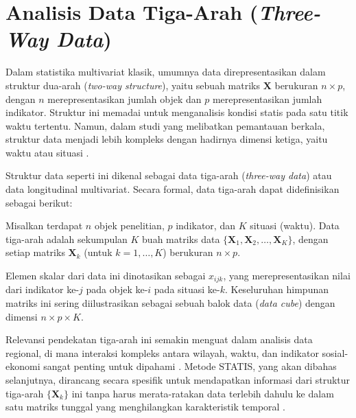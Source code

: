 \section{\normalsize Analisis Data Tiga-Arah (\textit{Three-Way Data})}

Dalam statistika multivariat klasik, umumnya data direpresentasikan dalam struktur dua-arah (\textit{two-way structure}), yaitu sebuah matriks $\mathbf{X}$ berukuran $n \times p$, dengan $n$ merepresentasikan jumlah objek dan $p$ merepresentasikan jumlah indikator. Struktur ini memadai untuk menganalisis kondisi statis pada satu titik waktu tertentu. Namun, dalam studi yang melibatkan pemantauan berkala, struktur data menjadi lebih kompleks dengan hadirnya dimensi ketiga, yaitu waktu atau situasi \citep{kroonenberg2008}.

Struktur data seperti ini dikenal sebagai data tiga-arah (\textit{three-way data}) atau data longitudinal multivariat. Secara formal, data tiga-arah dapat didefinisikan sebagai berikut:

\begin{definition}
  Misalkan terdapat $n$ objek penelitian, $p$ indikator, dan $K$ situasi (waktu). Data tiga-arah adalah sekumpulan $K$ buah matriks data $\{\mathbf{X}_1, \mathbf{X}_2, \dots, \mathbf{X}_K\}$, dengan setiap matriks $\mathbf{X}_k$ (untuk $k = 1, \dots, K$) berukuran $n \times p$.

  Elemen skalar dari data ini dinotasikan sebagai $x_{ijk}$, yang merepresentasikan nilai dari indikator ke-$j$ pada objek ke-$i$ pada situasi ke-$k$. Keseluruhan himpunan matriks ini sering diilustrasikan sebagai sebuah balok data (\textit{data cube}) dengan dimensi $n \times p \times K$.
\end{definition}

Relevansi pendekatan tiga-arah ini semakin menguat dalam analisis data regional, di mana interaksi kompleks antara wilayah, waktu, dan indikator sosial-ekonomi sangat penting untuk dipahami \citep{biegert2023household}. Metode STATIS, yang akan dibahas selanjutnya, dirancang secara spesifik untuk mendapatkan informasi dari struktur tiga-arah $\{\mathbf{X}_k\}$ ini tanpa harus merata-ratakan data terlebih dahulu ke dalam satu matriks tunggal yang menghilangkan karakteristik temporal \citep{lavit94}.

